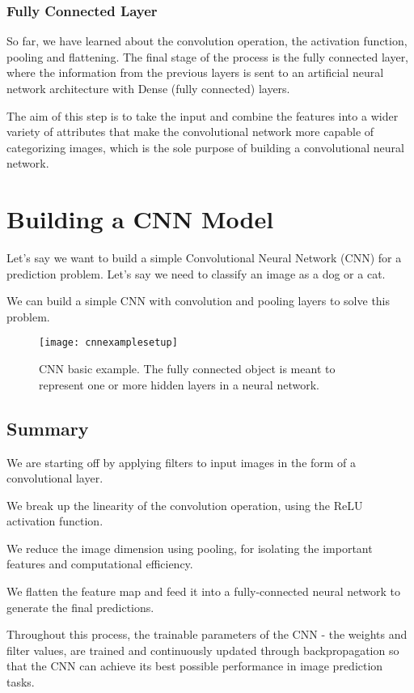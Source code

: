 	\subsubsection{Fully Connected Layer}
	\begin{bulletedlist}
		\item So far, we have learned about the convolution operation, the activation function, pooling and flattening. The final stage of the process is the fully connected layer, where the information from the previous layers is sent to an artificial neural network architecture with Dense (fully connected) layers.
		\item The aim of this step is to take the input and combine the features into a wider variety of attributes that make the convolutional network more capable of categorizing images, which is the sole purpose of building a convolutional neural network.
	\end{bulletedlist}


	\section{Building a CNN Model}
	\begin{bulletedlist}
		\item Let's say we want to build a simple Convolutional Neural Network (CNN) for a prediction problem.  Let's say we need to classify an image as a dog or a cat.
		\item We can build a simple CNN with convolution and pooling layers to solve this problem.
	\end{bulletedlist}

	\begin{figure}[tbh]
		\centering
		\texttt{[image: cnnexamplesetup]}
		\caption[CNN basic example]{CNN basic example.  The fully connected object is meant to represent one or more hidden layers in a neural network.}
		\label{fig:cnnexamplesetup}
	\end{figure}


	\subsection{Summary}
	\begin{bulletedlist}
		\item We are starting off by applying filters to input images in the form of a convolutional layer.
		\item We break up the linearity of the convolution operation, using the ReLU activation function.
		\item We reduce the image dimension using pooling, for isolating the important features and computational efficiency.
		\item We flatten the feature map and feed it into a fully-connected neural network to generate the final predictions.
		\item Throughout this process, the trainable parameters of the CNN - the weights and filter values, are trained and continuously updated through backpropagation so that the CNN can achieve its best possible performance in image prediction tasks.
	\end{bulletedlist}


